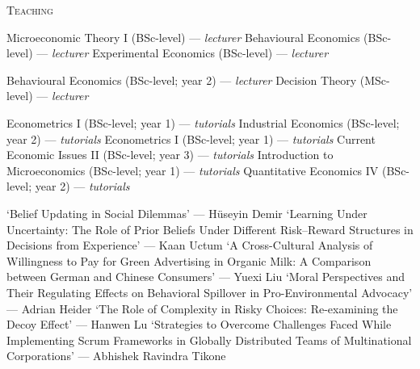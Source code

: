 \begin{rubric}{\textsc{Teaching}}

 Microeconomic Theory I (BSc-level) --- \emph{lecturer}
 Behavioural Economics (BSc-level) --- \emph{lecturer}
 Experimental Economics (BSc-level) --- \emph{lecturer}


\entry*[2020 -- 2025] Behavioural Economics (BSc-level; year 2) --- \emph{lecturer}
\entry*[2020 -- 2025] Decision Theory (MSc-level) --- \emph{lecturer}


\entry*[2017 -- 2018] Econometrics I (BSc-level; year 1) --- \emph{tutorials}
\entry*[2017 -- 2018] Industrial Economics (BSc-level; year 2) --- \emph{tutorials}
\entry*[2016 -- 2017] Econometrics I (BSc-level; year 1) --- \emph{tutorials}
\entry*[2016 -- 2017] Current Economic Issues II (BSc-level; year 3) --- \emph{tutorials}
\entry*[2015 -- 2016] Introduction to Microeconomics (BSc-level; year 1) --- \emph{tutorials}
\entry*[2015 -- 2016] Quantitative Economics IV (BSc-level; year 2) --- \emph{tutorials}



\entry*[2026] `Belief Updating in Social Dilemmas' --- H\"{u}seyin Demir
\entry*[2025] `Learning Under Uncertainty: The Role of Prior Beliefs Under Different Risk--Reward Structures in Decisions from Experience' --- Kaan Uctum
\entry*[2024] `A Cross-Cultural Analysis of Willingness to Pay for Green Advertising in Organic Milk: A Comparison between German and Chinese Consumers' --- Yuexi Liu
\entry*[2024] `Moral Perspectives and Their Regulating Effects on Behavioral Spillover in Pro-Environmental Advocacy' --- Adrian Heider
\entry*[2024] `The Role of Complexity in Risky Choices: Re-examining the Decoy Effect' --- Hanwen Lu
\entry*[2022] `Strategies to Overcome Challenges Faced While Implementing Scrum Frameworks in Globally Distributed Teams of Multinational Corporations' --- Abhishek Ravindra Tikone



\end{rubric}
